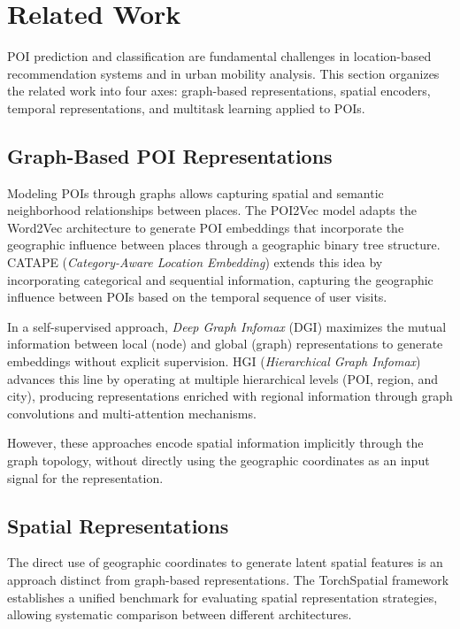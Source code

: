 \section{Related Work}
\label{sec:courb:related}

POI prediction and classification are fundamental challenges in location-based recommendation systems and in urban mobility analysis. This section organizes the related work into four axes: graph-based representations, spatial encoders, temporal representations, and multitask learning applied to POIs.

\subsection{Graph-Based POI Representations}

Modeling POIs through graphs allows capturing spatial and semantic neighborhood relationships between places. The POI2Vec model \cite{feng2017poi2vec} adapts the Word2Vec architecture to generate POI embeddings that incorporate the geographic influence between places through a geographic binary tree structure. CATAPE (\textit{Category-Aware Location Embedding}) \cite{rahmani2019category} extends this idea by incorporating categorical and sequential information, capturing the geographic influence between POIs based on the temporal sequence of user visits.

In a self-supervised approach, \textit{Deep Graph Infomax} (DGI) \cite{velickovic2019deep} maximizes the mutual information between local (node) and global (graph) representations to generate embeddings without explicit supervision. HGI (\textit{Hierarchical Graph Infomax}) \cite{huang2023hgi} advances this line by operating at multiple hierarchical levels (POI, region, and city), producing representations enriched with regional information through graph convolutions and multi-attention mechanisms.

However, these approaches encode spatial information implicitly through the graph topology, without directly using the geographic coordinates as an input signal for the representation.

\subsection{Spatial Representations}

The direct use of geographic coordinates to generate latent spatial features is an approach distinct from graph-based representations. The TorchSpatial framework \cite{wu2024torchspatial} establishes a unified benchmark for evaluating spatial representation strategies, allowing systematic comparison between different architectures.

